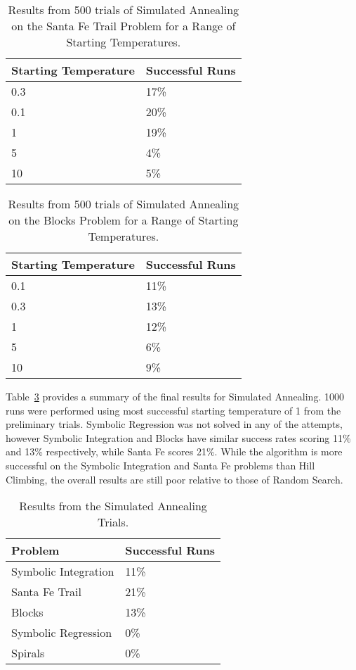 \begin{table}[h]
\begin{center}
\begin{tabular}{|l|l|}
\hline
Starting Temperature &  Successful Runs \\
\hline
0.3   &  17\%\\
0.1   &  20\%\\
1    &  19\% \\
5    &  4\% \\
10   &  5\% \\
\hline
\end{tabular}
\caption{\label{sa_santafe_sched_table} Results from 500 trials of Simulated Annealing on the Santa Fe Trail Problem for a Range of Starting Temperatures.}
\end{center}
\end{table}

\begin{table}[h]
\begin{center}
\begin{tabular}{|l|l|}
\hline
Starting Temperature &  Successful Runs \\
\hline
0.1   &   11\%\\
0.3    &   13\%\\
1     &   12\%\\
5     &   6\%\\
10    &   9\%\\
\hline
\end{tabular}
\caption{\label{sa_blocks_sched_table} Results from 500 trials of Simulated Annealing on the Blocks Problem for a Range of Starting Temperatures.}
\end{center}
\end{table}


Table~\ref{sa_results_table} provides a summary of the final results for Simulated Annealing. 1000 runs were performed using most successful starting temperature of 1 from the preliminary trials. Symbolic Regression was not solved in any of the attempts, however Symbolic Integration and Blocks have similar success rates scoring 11\% and 13\% respectively, while Santa Fe scores 21\%.
While the algorithm is more successful on the Symbolic Integration and Santa Fe problems than Hill Climbing, the overall results are still poor relative to those of Random Search. 

\begin{table}[h]
\begin{center}
\begin{tabular}{|l|l|}
\hline
Problem & Successful Runs \\
\hline
Symbolic Integration & 11\% \\
Santa Fe Trail & 21\% \\
Blocks & 13\% \\
Symbolic Regression & 0\% \\
Spirals & 0\% \\
\hline
\end{tabular}
\caption{ \label{sa_results_table} Results from the Simulated Annealing Trials.}
\end{center}
\end{table}





